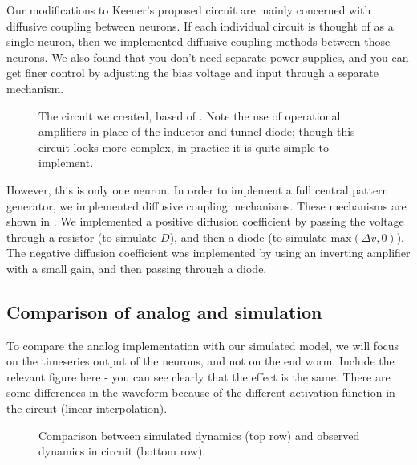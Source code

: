 \documentclass[
    11pt,
]{article}
\begin{document}
Our modifications to Keener's proposed circuit are mainly concerned with diffusive coupling between neurons.  If each individual circuit is thought of as a single neuron, then we implemented diffusive coupling methods between those neurons.  We also found that you don't need separate power supplies, and you can get finer control by adjusting the bias voltage and input through a separate mechanism.

\begin{figure}[h!]
    \centering
    \caption{The circuit we created, based of \citet{keener1983}.  Note the use of operational amplifiers in place of the inductor and tunnel diode; though this circuit looks more complex, in practice it is quite simple to implement.}
    \label{fig: neuron_unit}
\end{figure}

However, this is only one neuron.  In order to implement a full central pattern generator, we implemented diffusive coupling mechanisms.  These mechanisms are shown in .  We implemented a positive diffusion coefficient by passing the voltage through a resistor (to simulate $D$), and then a diode (to simulate $\mathrm{max}(\Delta v, 0)$).  The negative diffusion coefficient was implemented by using an inverting amplifier with a small gain, and then passing through a diode.

\subsection{Comparison of analog and simulation}

To compare the analog implementation with our simulated model, we will focus on the timeseries output of the neurons, and not on the end worm.  Include the relevant figure here - you can see clearly that the effect is the same.  There are some differences in the waveform because of the different activation function in the circuit (linear interpolation).

\begin{figure}[h!]
    \centering
    \pgfplotsset{}
    \caption{Comparison between simulated dynamics (top row) and observed dynamics in circuit (bottom row).}
    \label{fig: anal_sim_comp}
\end{figure}

\end{document}
